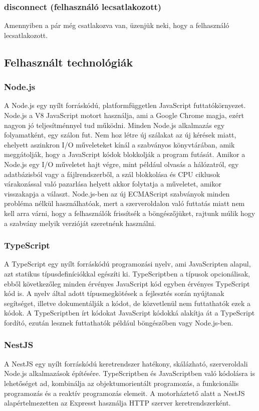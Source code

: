 \documentclass{elteikthesis}
\begin{document}
				\subsubsection{disconnect (felhasználó lecsatlakozott)}
					Amennyiben a pár még csatlakozva van, üzenjük neki, hogy a felhasználó lecsatlakozott.

			\subsection{Felhasznált technológiák}				
				\subsubsection{Node.js}
					A Node.js \cite{nodejs} egy nyílt forráskódú, platformfüggetlen JavaScript futtatókörnyezet. Node.js a V8 JavaScript motort használja, ami a Google Chrome magja, ezért nagyon jó teljesítménnyel tud működni. Minden Node.js alkalmazás egy folyamatként, egy szálon fut. Nem hoz létre új szálakat az új kérések miatt, ehelyett aszinkron I/O műveleteket kínál a szabványos könyvtárában, amik meggátolják, hogy a JavaScript kódok blokkolják a program futását. Amikor a Node.js egy I/O műveletet hajt végre, mint például olvasás a hálózatról, egy adatbázisból vagy a fájlrendszerből, a szál blokkolása és CPU ciklusok várakozással való pazarlása helyett akkor folytatja a műveletet, amikor visszakapja a választ. Node.js-ben az új ECMAScript szabványok minden probléma nélkül használhatóak, mert a szerveroldalon való futtatás miatt nem kell arra várni, hogy a felhasználók frissítsék a böngészőjüket, rajtunk múlik hogy a szabvány melyik verzióját szeretnénk használni.
				
				\subsubsection{TypeScript}
					A TypeScript \cite{typescript} egy nyílt forráskódú programozási nyelv, ami JavaScripten alapul, azt statikus típusdefiníciókkal egészíti ki. TypeScriptben a típusok opcionálisak, ebből következőleg minden érvényes JavaScript kód egyben érvényes TypeScript kód is. A nyelv által adott típusmegkötések a fejlesztés során nyújtanak segítséget, illetve dokumentálják a kódot, de közvetlenül nem futtathatók ezek a kódok. A TypeScriptben írt kódokat JavaScript kódokká alakítja át a TypeScript fordító, ezután lesznek futtathatók például böngészőben vagy Node.js-ben.
				
				\subsubsection{NestJS}
					A NestJS \cite{nestjs} egy nyílt forráskódú keretrendszer hatékony, skálázható, szerveroldali Node.js alkalmazások építésére. TypeScriptben és JavaScriptben való kódolásra is lehetőséget ad, kombinálja az objektumorientált programozás, a funkcionális programozás és a reaktív programozás elemeit. A motorháztető alatt a NestJS alapértelmezetten az Expresst használja HTTP szerver keretrendszerként.
				
\end{document}

